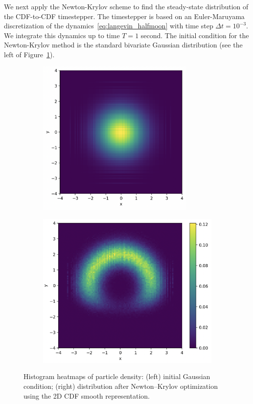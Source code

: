 \documentclass{article}
\begin{document}
We next apply the Newton-Krylov scheme to find the steady-state distribution of the CDF-to-CDF timestepper. The timestepper is based on an Euler-Maruyama discretization of the dynamics~\eqref{eq:langevin_halfmoon} with time step $\Delta t = 10^{-3}$. We integrate this dynamics up to time $T = 1$ second. The initial condition for the Newton-Krylov method is the standard bivariate Gaussian distribution (see the left of Figure~\ref{fig:nk_2dcdf}). 
\begin{figure}[h]
    \centering
    \begin{subfigure}[b]{0.51\textwidth}
        \centering
        \includegraphics[width=0.852\textwidth]{figures/InitialGaussian.png}
    \end{subfigure}%
    \begin{subfigure}[b]{0.51\textwidth}
        \centering
        \includegraphics[width=\textwidth]{figures/CDF2DHalfMoon.png}
    \end{subfigure}
    \caption{Histogram heatmaps of particle density: (left) initial Gaussian condition; (right) distribution after Newton–Krylov optimization using the 2D CDF smooth representation.}
    \label{fig:nk_2dcdf}
\end{figure}
\end{document}
